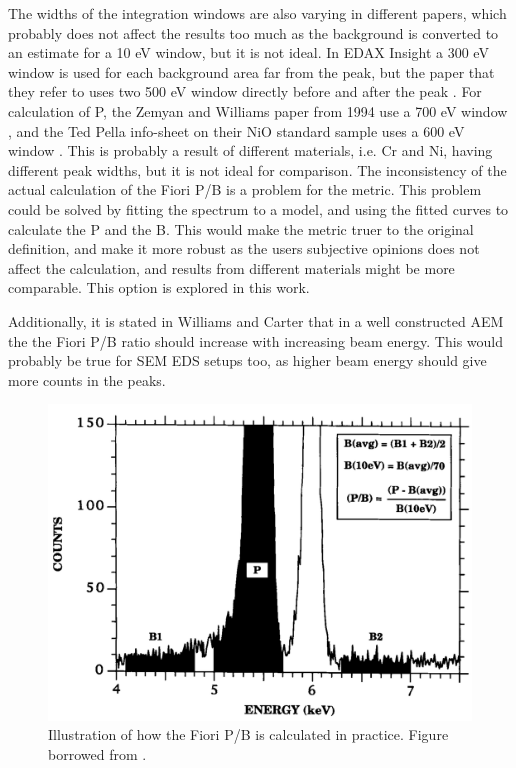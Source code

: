 The widths of the integration windows are also varying in different papers, which probably does not affect the results too much as the background is converted to an estimate for a 10 eV window, but it is not ideal.
In EDAX Insight a 300 eV window is used for each background area far from the peak, but the paper that they refer to uses two 500 eV window directly before and after the peak \cite{egerton_nio_characterization_1994}.
For calculation of P, the Zemyan and Williams paper from 1994 use a 700 eV window \cite{zemyan_standard_performance_1994}, and the Ted Pella info-sheet on their NiO standard sample uses a 600 eV window \cite{ted_pella_nio_tem_2019}.
This is probably a result of different materials, i.e. Cr and Ni, having different peak widths, but it is not ideal for comparison.
The inconsistency of the actual calculation of the Fiori P/B is a problem for the metric.
This problem could be solved by fitting the spectrum to a model, and using the fitted curves to calculate the P and the B.
This would make the metric truer to the original definition, and make it more robust as the users subjective opinions does not affect the calculation, and results from different materials might be more comparable.
This option is explored in this work.

Additionally, it is stated in Williams and Carter \cite[p. 614]{williams_carter_tem_2009} that in a well constructed AEM the the Fiori P/B ratio should increase with increasing beam energy.
This would probably be true for SEM EDS setups too, as higher beam energy should give more counts in the peaks.






\begin{figure}
    \centering
    \includegraphics[width=0.6\linewidth]{figures/FioriPB_reality_TODO_remake.png}
    \caption{Illustration of how the Fiori P/B is calculated in practice.
        Figure borrowed from \cite{zemyan_standard_performance_1994}.}
    \label{fig:fiori_pb_reality}
\end{figure}


